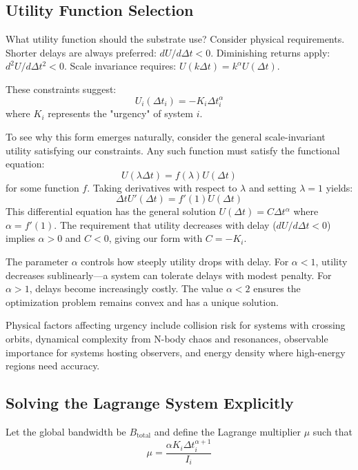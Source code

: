 \documentclass[twocolumn,prd,amsmath,amssymb,aps,superscriptaddress,nofootinbib]{revtex4-2}
\begin{document}
\subsection{Utility Function Selection}

What utility function should the substrate use? Consider physical requirements. Shorter delays are always preferred: $dU/d\Delta t < 0$. Diminishing returns apply: $d^2U/d\Delta t^2 < 0$. Scale invariance requires: $U(k\Delta t) = k^\alpha U(\Delta t)$.

These constraints suggest:
\begin{equation}
U_i(\Delta t_i) = -K_i \Delta t_i^\alpha
\end{equation}
where $K_i$ represents the "urgency" of system $i$.

To see why this form emerges naturally, consider the general scale-invariant utility satisfying our constraints. Any such function must satisfy the functional equation:
\begin{equation}
U(\lambda \Delta t) = f(\lambda) U(\Delta t)
\end{equation}
for some function $f$. Taking derivatives with respect to $\lambda$ and setting $\lambda = 1$ yields:
\begin{equation}
\Delta t U'(\Delta t) = f'(1) U(\Delta t)
\end{equation}
This differential equation has the general solution $U(\Delta t) = C \Delta t^{\alpha}$ where $\alpha = f'(1)$. The requirement that utility decreases with delay ($dU/d\Delta t < 0$) implies $\alpha > 0$ and $C < 0$, giving our form with $C = -K_i$.

The parameter $\alpha$ controls how steeply utility drops with delay. For $\alpha < 1$, utility decreases sublinearly---a system can tolerate delays with modest penalty. For $\alpha > 1$, delays become increasingly costly. The value $\alpha < 2$ ensures the optimization problem remains convex and has a unique solution.

Physical factors affecting urgency include collision risk for systems with crossing orbits, dynamical complexity from N-body chaos and resonances, observable importance for systems hosting observers, and energy density where high-energy regions need accuracy.

\subsection{Solving the Lagrange System Explicitly}

Let the global bandwidth be $B_{\text{total}}$ and define the Lagrange multiplier $\mu$ such that
\begin{equation}
\mu = \frac{\alpha K_i \Delta t_i^{\alpha+1}}{I_i}
\end{equation}
\end{document}

